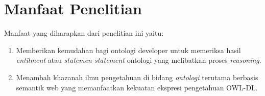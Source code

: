 \section{Manfaat Penelitian}
Manfaat yang diharapkan dari penelitian ini yaitu:
\begin{enumerate}
	\item Memberikan kemudahan bagi ontologi developer untuk memeriksa hasil \emph{entilment} atau \emph{statemen-statement} ontologi yang melibatkan proses \emph{reasoning}.
	\item Menambah khazanah ilmu pengetahuan di bidang \emph{ontologi} terutama berbasis semantik web yang memanfaatkan kekuatan ekspresi pengetahuan OWL-DL.
\end{enumerate}